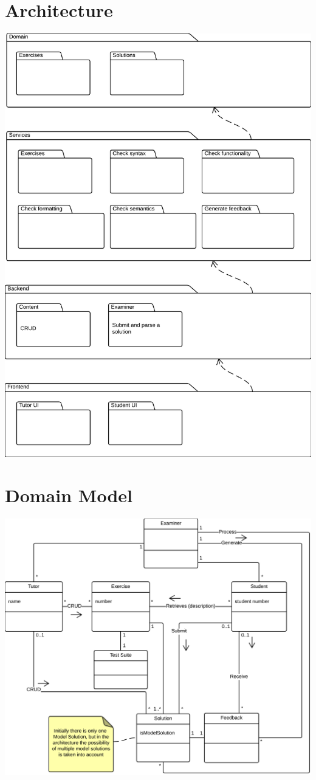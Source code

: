 \section{Architecture}
\includegraphics[scale=0.55] {diagrams-images/architecture}

\section{Domain Model}
\includegraphics[scale=0.8]{diagrams-images/domain-model}

